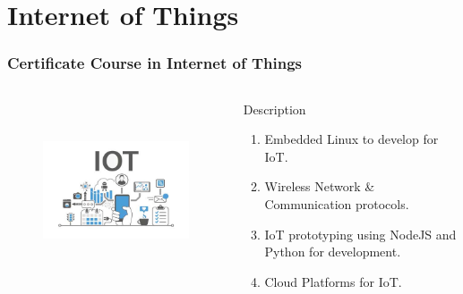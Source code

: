 \section{Internet of Things}
\begin{frame}
	\frametitle{Certificate Course in Internet of Things}
	\begin{columns}
		
			
		\begin{figure}
			\includegraphics[width=200pt,height=150pt]{figures/course_iot.jpg}
		\end{figure}
	

	\begin{block}{Description}
	
		\begin{enumerate}
			\item Embedded	Linux to develop for IoT. 
			\item Wireless Network \& Communication protocols.
			\item IoT prototyping using NodeJS and Python for development.
			\item Cloud Platforms for IoT.
		\end{enumerate}
	  	  
	\end{block}

	\end{columns}
\end{frame}







